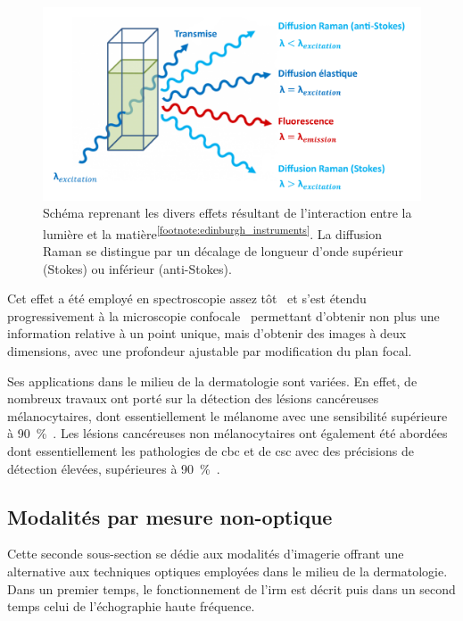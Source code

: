 \begin{figure}[H]
    \centering
    \includegraphics[width=\linewidth]{contents/chapter_2/resources/scheme_principle_raman.pdf}
    \caption{Schéma reprenant les divers effets résultant de l'interaction entre la lumière et la matière\textsuperscript{\ref{footnote:edinburgh_instruments}}. La diffusion Raman se distingue par un décalage de longueur d'onde supérieur (Stokes) ou inférieur (anti-Stokes).}
    \label{fig:scheme_principle_raman}
\end{figure}\par

\addtocounter{footnote}{1}

Cet effet a été employé en spectroscopie assez tôt~\cite{Ferraro2003} et s'est étendu progressivement à la microscopie confocale~\cite{Caspers2003} permettant d'obtenir non plus une information relative à un point unique, mais d'obtenir des images à deux dimensions, avec une profondeur ajustable par modification du plan focal.\par

Ses applications dans le milieu de la dermatologie sont variées. En effet, de nombreux travaux ont porté sur la détection des lésions cancéreuses mélanocytaires, dont essentiellement le mélanome avec une sensibilité supérieure à 90~\%~\cite{Lui2012,Schleusener2015}. Les lésions cancéreuses non mélanocytaires ont également été abordées dont essentiellement les pathologies de \gls{cbc} et de \gls{csc} avec des précisions de détection élevées, supérieures à 90~\%~\cite{Lieber2008,Silveira2015}.\par
\clearpage

\subsection{Modalités par mesure non-optique}
Cette seconde sous-section se dédie aux modalités d'imagerie offrant une alternative aux techniques optiques employées dans le milieu de la dermatologie. Dans un premier temps, le fonctionnement de l'\gls{irm} est décrit puis dans un second temps celui de l'échographie haute fréquence.\par

